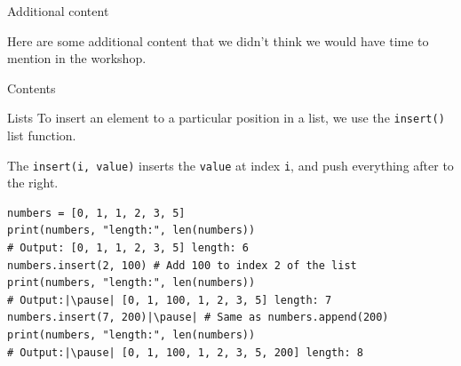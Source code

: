 \documentclass[dvipsnames, svgnames, x11names]{beamer}
\begin{document}
\setcounter{framenumber}{0}











\begin{frame}{Additional content}
	\begin{center}
		Here are some additional content that we didn't think we would have time to mention in the workshop.
	\end{center}
\end{frame}

\begin{frame}{Contents} 
\begin{center}
\end{center}
\end{frame}

\begin{frame}[fragile]{Lists}
To insert an element to a particular position in a list, we use the \texttt{insert()} list function.

The \texttt{insert(i, value)} inserts the \texttt{value} at index \texttt{i}, and push everything after to the right. \pause
\begin{verbatim}
numbers = [0, 1, 1, 2, 3, 5]
print(numbers, "length:", len(numbers)) 
# Output: [0, 1, 1, 2, 3, 5] length: 6
numbers.insert(2, 100) # Add 100 to index 2 of the list
print(numbers, "length:", len(numbers))  
# Output:|\pause| [0, 1, 100, 1, 2, 3, 5] length: 7
numbers.insert(7, 200)|\pause| # Same as numbers.append(200)
print(numbers, "length:", len(numbers))  
# Output:|\pause| [0, 1, 100, 1, 2, 3, 5, 200] length: 8
\end{verbatim}
\end{frame}
\end{document}
